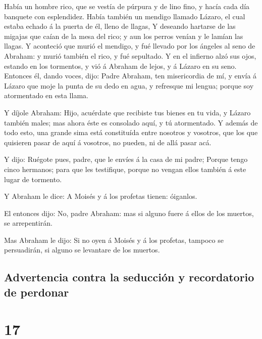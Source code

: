  Había un hombre rico, que se vestía de púrpura y de lino
fino, y hacía cada día banquete con esplendidez.  Había
también un mendigo llamado Lázaro, el cual estaba echado á la puerta de
él, lleno de llagas,  Y deseando hartarse de las migajas
que caían de la mesa del rico; y aun los perros venían y le lamían las
llagas.  Y aconteció que murió el mendigo, y fué llevado
por los ángeles al seno de Abraham: y murió también el rico, y fué
sepultado.  Y en el infierno alzó sus ojos, estando en
los tormentos, y vió á Abraham de lejos, y á Lázaro en su seno.
 Entonces él, dando voces, dijo: Padre Abraham, ten
misericordia de mí, y envía á Lázaro que moje la punta de su dedo en
agua, y refresque mi lengua; porque soy atormentado en esta llama.

 Y díjole Abraham: Hijo, acuérdate que recibiste tus
bienes en tu vida, y Lázaro también males; mas ahora éste es consolado
aquí, y tú atormentado.  Y además de todo esto, una
grande sima está constituída entre nosotros y vosotros, que los que
quisieren pasar de aquí á vosotros, no pueden, ni de allá pasar acá.

 Y dijo: Ruégote pues, padre, que le envíes á la casa de
mi padre;  Porque tengo cinco hermanos; para que les
testifique, porque no vengan ellos también á este lugar de tormento.

 Y Abraham le dice: A Moisés y á los profetas tienen:
óiganlos.

 El entonces dijo: No, padre Abraham: mas si alguno fuere
á ellos de los muertos, se arrepentirán.

 Mas Abraham le dijo: Si no oyen á Moisés y á los
profetas, tampoco se persuadirán, si alguno se levantare de los muertos.

\hypertarget{advertencia-contra-la-seducciuxf3n-y-recordatorio-de-perdonar}{%
\subsection{Advertencia contra la seducción y recordatorio de
perdonar}\label{advertencia-contra-la-seducciuxf3n-y-recordatorio-de-perdonar}}

\hypertarget{section-42-17}{%
\section{17}\label{section-42-17}}

